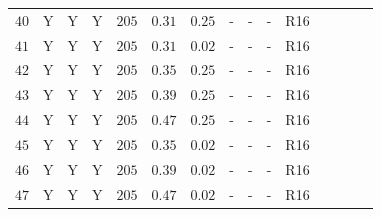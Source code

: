 \begin{center}
\begin{longtable}{@{\extracolsep{\fill}}ccccccccccccccc@{}}
\rule[-1ex]{0pt}{2.5ex} $40$ & Y & Y & Y & $205$ & $0.31 $ & $0.25$ & - & - & - & R16 & \cite{Riess:2016jrr} & \cite{Pietrzynski:2013gia} & \cite{Riess:2016jrr} & \cite{Riess:2016jrr} \\ 
\rule[-1ex]{0pt}{2.5ex} $41$ & Y & Y & Y & $205$ & $0.31 $ & $0.02$ & - & - & - & R16 & \cite{Riess:2016jrr} & \cite{Pietrzynski:2013gia} & \cite{Riess:2016jrr} & \cite{Riess:2016jrr} \\
\rule[-1ex]{0pt}{2.5ex} $42$ & Y & Y & Y & $205$ & $0.35 $ & $0.25$ & - & - & - & R16 & \cite{Riess:2016jrr} & \cite{Pietrzynski:2013gia} & \cite{Riess:2016jrr} & \cite{Riess:2016jrr} \\
\rule[-1ex]{0pt}{2.5ex} $43$ & Y & Y & Y & $205$ & $0.39 $ & $0.25$ & - & - & - & R16 & \cite{Riess:2016jrr} & \cite{Pietrzynski:2013gia} & \cite{Riess:2016jrr} & \cite{Riess:2016jrr} \\
\rule[-1ex]{0pt}{2.5ex} $44$ & Y & Y & Y & $205$ & $0.47 $ & $0.25$ & - & - & - & R16 & \cite{Riess:2016jrr} & \cite{Pietrzynski:2013gia} & \cite{Riess:2016jrr} & \cite{Riess:2016jrr} \\
\rule[-1ex]{0pt}{2.5ex} $45$ & Y & Y & Y & $205$ & $0.35 $ & $0.02$ & - & - & - & R16 & \cite{Riess:2016jrr} & \cite{Pietrzynski:2013gia} & \cite{Riess:2016jrr} & \cite{Riess:2016jrr} \\
\rule[-1ex]{0pt}{2.5ex} $46$ & Y & Y & Y & $205$ & $0.39 $ & $0.02$ & - & - & - & R16 & \cite{Riess:2016jrr} & \cite{Pietrzynski:2013gia} & \cite{Riess:2016jrr} & \cite{Riess:2016jrr} \\
\rule[-1ex]{0pt}{2.5ex} $47$ & Y & Y & Y & $205$ & $0.47 $ & $0.02$ & - & - & - & R16 & \cite{Riess:2016jrr} & \cite{Pietrzynski:2013gia} & \cite{Riess:2016jrr} & \cite{Riess:2016jrr} \\


\end{longtable}
\end{center}
